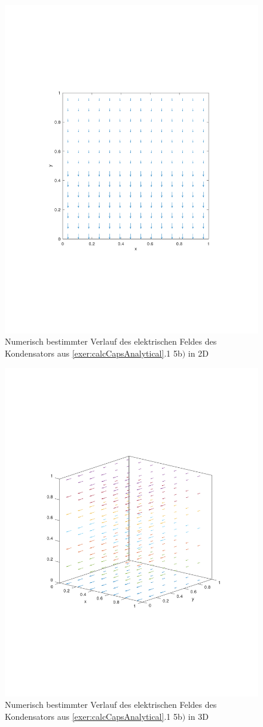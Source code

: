 \documentclass[Protokollheft.tex]{subfiles}
\begin{document}
\begin{figure}[h!]
	\centering
	\includegraphics[trim = 20mm 70mm 20mm 70mm, clip,width=0.7\linewidth]{E_2D_B.pdf}
	\caption{Numerisch bestimmter Verlauf des elektrischen Feldes des Kondensators aus \ref{exer:calcCapsAnalytical}.1 5b$)$ in 2D}
\end{figure}

\begin{figure}[h!]
	\centering
	\includegraphics[trim = 20mm 70mm 20mm 70mm, clip,width=0.7\linewidth]{E_3D_B.pdf}
	\caption{Numerisch bestimmter Verlauf des elektrischen Feldes des Kondensators aus \ref{exer:calcCapsAnalytical}.1 5b$)$ in 3D}
\end{figure}
\end{document}
